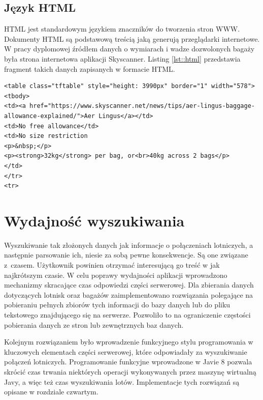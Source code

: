 \documentclass[12pt, twoside]{report}
\begin{document}
\subsection{Język HTML}
HTML jest standardowym językiem znaczników do tworzenia stron WWW. Dokumenty HTML są podstawową treścią jaką generują przeglądarki internetowe. W pracy dyplomowej źródłem danych o wymiarach i wadze dozwolonych bagaży była strona internetowa aplikacji Skyscanner\cite{html}. Listing \ref{lst::html} przedstawia fragment takich danych zapisanych w formacie HTML.
\begin{lstlisting}[language=HTML5, caption= Fragment dokumentu HTML, label=lst::html]
<table class="tftable" style="height: 3990px" border="1" width="578">
<tbody>
<td><a href="https://www.skyscanner.net/news/tips/aer-lingus-baggage-allowance-explained/">Aer Lingus</a></td>
<td>No free allowance</td>
<td>No size restriction
<p>&nbsp;</p>
<p><strong>32kg</strong> per bag, or<br>40kg across 2 bags</p>
</td>
</tr>
<tr>
\end{lstlisting}

\section{Wydajność wyszukiwania}
Wyszukiwanie tak złożonych danych jak informacje o połączeniach lotniczych, a następnie parsowanie ich, niesie za sobą pewne konsekwencje. Są one związane z~czasem. Użytkownik powinien otrzymać interesującą go treść w jak najkrótszym czasie. W celu poprawy wydajności aplikacji wprowadzono mechanizmy skracające czas odpowiedzi części serwerowej.
Dla zbierania danych dotyczących lotnisk oraz bagażów zaimplementowano rozwiązania polegające na pobieraniu pełnych zbiorów tych informacji do bazy danych lub do pliku tekstowego znajdującego się na serwerze. Pozwoliło to na ograniczenie częstości pobierania danych ze stron lub zewnętrznych baz danych.

Kolejnym rozwiązaniem było wprowadzenie funkcyjnego stylu programowania w kluczowych elementach części serwerowej, które odpowiadały za wyszukiwanie połączeń lotniczych.  Programowanie funkcyjne wprowadzone w Javie 8 pozwala skrócić czas trwania niektórych operacji wykonywanych przez maszynę wirtualną Javy, a więc też czas wyszukiwania lotów.
Implementacje tych rozwiązań są opisane w rozdziale czwartym.
\end{document}
